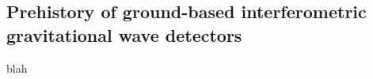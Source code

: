 \subsection{Prehistory of ground-based interferometric gravitational wave detectors}\label{subsec:prehistory}

blah